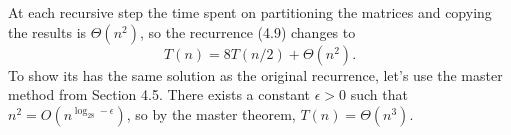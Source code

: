 At each recursive step the time spent on partitioning the matrices and copying the results is $\Theta(n^2)$, so the recurrence (4.9) changes to
\[
    T(n) = 8T(n/2)+\Theta(n^2).
\]
To show its has the same solution as the original recurrence, let's use the master method from Section 4.5.
There exists a constant $\epsilon>0$ such that $n^2=O(n^{\log_28-\epsilon})$, so by the master theorem, $T(n)=\Theta(n^3)$.
